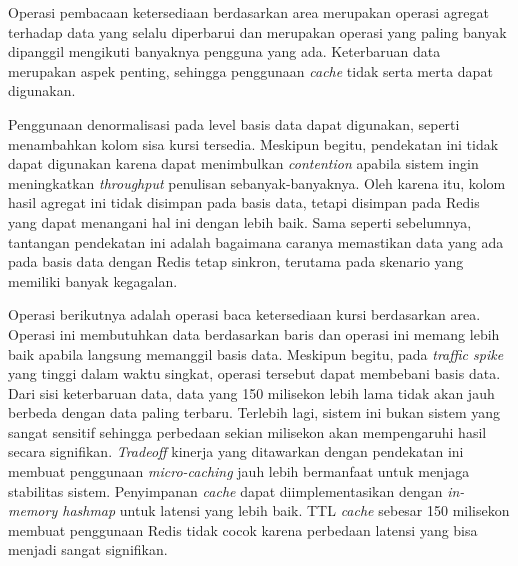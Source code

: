Operasi pembacaan ketersediaan berdasarkan area merupakan operasi agregat terhadap data yang selalu diperbarui dan merupakan operasi yang paling banyak dipanggil mengikuti banyaknya pengguna yang ada. Keterbaruan data merupakan aspek penting, sehingga penggunaan \textit{cache} tidak serta merta dapat digunakan.

Penggunaan denormalisasi pada level basis data dapat digunakan, seperti menambahkan kolom sisa kursi tersedia. Meskipun begitu, pendekatan ini tidak dapat digunakan karena dapat menimbulkan \textit{contention} apabila sistem ingin meningkatkan \textit{throughput} penulisan sebanyak-banyaknya. Oleh karena itu, kolom hasil agregat ini tidak disimpan pada basis data, tetapi disimpan pada Redis yang dapat menangani hal ini dengan lebih baik. Sama seperti sebelumnya, tantangan pendekatan ini adalah bagaimana caranya memastikan data yang ada pada basis data dengan Redis tetap sinkron, terutama pada skenario yang memiliki banyak kegagalan.

Operasi berikutnya adalah operasi baca ketersediaan kursi berdasarkan area. Operasi ini membutuhkan data berdasarkan baris dan operasi ini memang lebih baik apabila langsung memanggil basis data. Meskipun begitu, pada \textit{traffic spike} yang tinggi dalam waktu singkat, operasi tersebut dapat membebani basis data. Dari sisi keterbaruan data, data yang 150 milisekon lebih lama tidak akan jauh berbeda dengan data paling terbaru. Terlebih lagi, sistem ini bukan sistem yang sangat sensitif sehingga perbedaan sekian milisekon akan mempengaruhi hasil secara signifikan. \textit{Tradeoff} kinerja yang ditawarkan dengan pendekatan ini membuat penggunaan \textit{micro-caching} jauh lebih bermanfaat untuk menjaga stabilitas sistem. Penyimpanan \textit{cache} dapat diimplementasikan dengan \textit{in-memory hashmap} untuk latensi yang lebih baik. TTL \textit{cache} sebesar 150 milisekon membuat penggunaan Redis tidak cocok karena perbedaan latensi yang bisa menjadi sangat signifikan.
